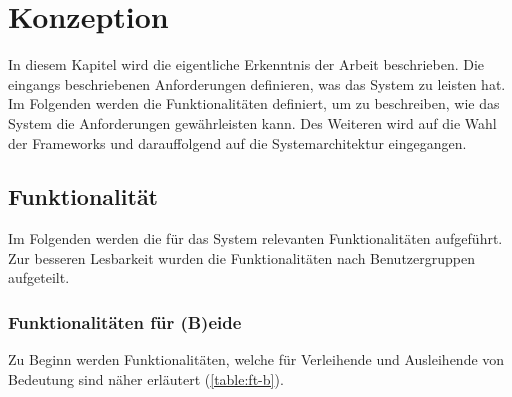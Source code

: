 \chapter{Konzeption}
\label{chapter-konzept}

In diesem Kapitel wird die eigentliche Erkenntnis der Arbeit beschrieben. Die eingangs beschriebenen
Anforderungen definieren, was das System zu leisten hat. Im Folgenden werden die Funktionalitäten
definiert, um zu beschreiben, wie das System die Anforderungen gewährleisten kann. Des Weiteren wird
auf die Wahl der Frameworks und darauffolgend auf die Systemarchitektur eingegangen.

\section{Funktionalität}
\label{section:funktionalitaeten}
Im Folgenden werden die für das System relevanten Funktionalitäten aufgeführt. Zur besseren
Lesbarkeit wurden die Funktionalitäten nach Benutzergruppen aufgeteilt.

\subsection{Funktionalitäten für (B)eide}
Zu Beginn werden Funktionalitäten, welche für Verleihende und Ausleihende von Bedeutung sind
näher erläutert (\ref{table:ft-b}).

